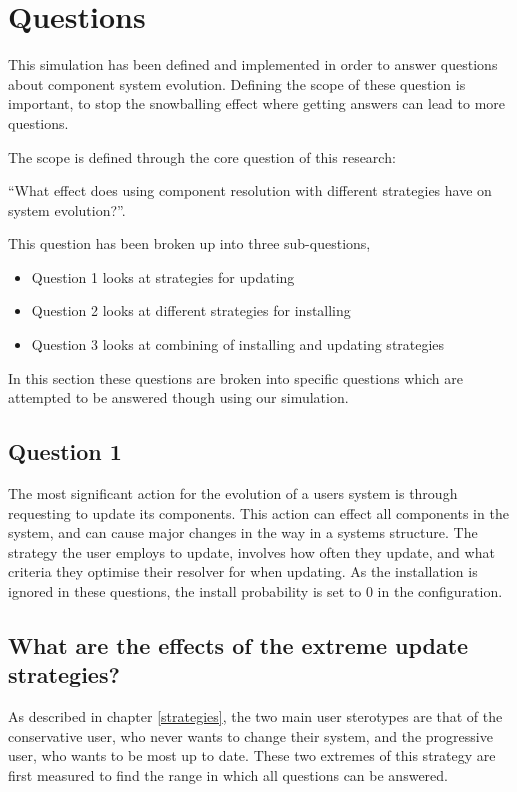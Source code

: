 


\section{Questions}
This simulation has been defined and implemented in order to answer questions about component system evolution.
Defining the scope of these question is important, to stop the snowballing effect where getting answers can lead to more questions. 

The scope is defined through the core question of this research:

``What effect does using component resolution with different strategies have on system evolution?''.

This question has been broken up into three sub-questions,
\begin{itemize}
  \item Question 1 looks at strategies for updating
  \item Question 2 looks at different strategies for installing
  \item Question 3 looks at combining of installing and updating strategies
\end{itemize}

In this section these questions are broken into specific questions which are attempted to be answered though using our simulation.

\subsection{Question 1}
The most significant action for the evolution of a users system is through requesting to update its components.
This action can effect all components in the system, and can cause major changes in the way in a systems structure.
The strategy the user employs to update, involves how often they update, and what criteria they optimise their resolver for when updating.
As the installation is ignored in these questions, the install probability is set to 0 in the configuration.


\subsection{What are the effects of the extreme update strategies?}
As described in chapter \ref{strategies}, the two main user sterotypes are that of the conservative user, who never wants to change their system,
and the progressive user, who wants to be most up to date.
These two extremes of this strategy are first measured to find the range in which all questions can be answered.


